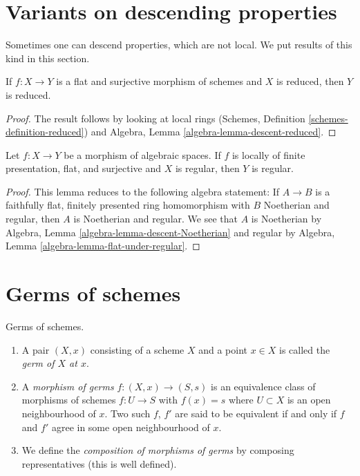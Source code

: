 \section{Variants on descending properties}
\label{section-variants}

\noindent
Sometimes one can descend properties, which are not local.
We put results of this kind in this section.

\begin{lemma}
\label{lemma-descend-reduced}
If $f : X \to Y$ is a flat and surjective morphism of schemes
and $X$ is reduced, then $Y$ is reduced.
\end{lemma}

\begin{proof}
The result follows by looking at local rings
(Schemes, Definition \ref{schemes-definition-reduced})
and
Algebra, Lemma \ref{algebra-lemma-descent-reduced}.
\end{proof}

\begin{lemma}
\label{lemma-descend-regular}
Let $f : X \to Y$ be a morphism of algebraic spaces.
If $f$ is locally of finite presentation, flat, and surjective and
$X$ is regular, then $Y$ is regular.
\end{lemma}

\begin{proof}
This lemma reduces to the following algebra statement: If $A \to B$ is
a faithfully flat, finitely presented ring homomorphism with $B$ Noetherian
and regular, then $A$ is Noetherian and regular. We see that
$A$ is Noetherian by
Algebra, Lemma \ref{algebra-lemma-descent-Noetherian}
and regular by
Algebra, Lemma \ref{algebra-lemma-flat-under-regular}.
\end{proof}









\section{Germs of schemes}
\label{section-germs}

\begin{definition}
\label{definition-germs}
Germs of schemes.
\begin{enumerate}
\item A pair $(X, x)$ consisting of a scheme $X$ and a point $x \in X$ is
called the {\it germ of $X$ at $x$}.
\item A {\it morphism of germs} $f : (X, x) \to (S, s)$
is an equivalence class of morphisms of schemes $f : U \to S$ with $f(x) = s$
where $U \subset X$ is an open neighbourhood of $x$. Two such
$f$, $f'$ are said to be equivalent if and only if $f$ and $f'$
agree in some open neighbourhood of $x$.
\item We define the {\it composition of morphisms of germs}
by composing representatives (this is well defined).
\end{enumerate}
\end{definition}

